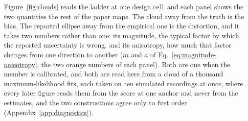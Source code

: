 Figure~\ref{fig:clouds} reads the ladder at one design cell, and each panel shows the two quantities the rest of
the paper maps. The cloud away from the truth is the bias. The reported ellipse away from the
empirical one is the distortion, and it takes two numbers rather than one: its magnitude, the typical factor by
which the reported uncertainty is wrong, and its anisotropy, how much that factor changes from one
direction to another ($m$ and $a$ of Eq.~\eqref{eq:magnitude-anisotropy}, the two orange numbers of
each panel). Both are one when the member is calibrated, and both are read here from a cloud of a thousand
maximum-likelihood fits, each taken on ten simulated recordings at once, where every later figure
reads them from the score at one anchor and never from the estimates, and the two constructions
agree only to first order (Appendix~\ref{app:diagnostics}).


